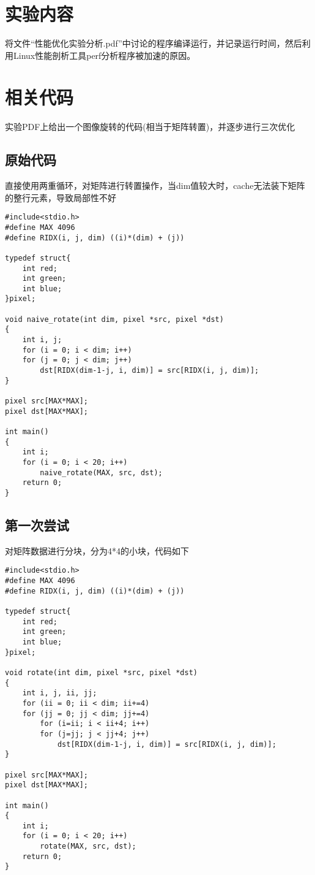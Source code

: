 \documentclass{article}
\title{
    \centering\textbf{ \hmwkTitle}
    \author{\hmwkAuthorName}
}
\begin{document}
\maketitle

\section{实验内容}
将文件“性能优化实验分析.pdf”中讨论的程序编译运行，并记录运行时间，然后利用Linux性能剖析工具perf分析程序被加速的原因。

\section{相关代码}
实验PDF上给出一个图像旋转的代码(相当于矩阵转置)，并逐步进行三次优化
\subsection{原始代码}
直接使用两重循环，对矩阵进行转置操作，当dim值较大时，cache无法装下矩阵的整行元素，导致局部性不好
\begin{lstlisting}
#include<stdio.h>
#define MAX 4096
#define RIDX(i, j, dim) ((i)*(dim) + (j))
    
typedef struct{
    int red; 
    int green; 
    int blue;
}pixel;
    
void naive_rotate(int dim, pixel *src, pixel *dst)
{
    int i, j;
    for (i = 0; i < dim; i++)
    for (j = 0; j < dim; j++)
        dst[RIDX(dim-1-j, i, dim)] = src[RIDX(i, j, dim)];
}
    
pixel src[MAX*MAX];
pixel dst[MAX*MAX];
    
int main() 
{
    int i;
    for (i = 0; i < 20; i++)
        naive_rotate(MAX, src, dst);
    return 0;
}
\end{lstlisting}

\subsection{第一次尝试}
对矩阵数据进行分块，分为4*4的小块，代码如下
\begin{lstlisting}
#include<stdio.h>
#define MAX 4096
#define RIDX(i, j, dim) ((i)*(dim) + (j))

typedef struct{
    int red; 
    int green; 
    int blue;
}pixel;

void rotate(int dim, pixel *src, pixel *dst)
{
    int i, j, ii, jj;
    for (ii = 0; ii < dim; ii+=4)
    for (jj = 0; jj < dim; jj+=4)
        for (i=ii; i < ii+4; i++)
        for (j=jj; j < jj+4; j++)
            dst[RIDX(dim-1-j, i, dim)] = src[RIDX(i, j, dim)];
}

pixel src[MAX*MAX];
pixel dst[MAX*MAX];

int main() 
{
    int i;
    for (i = 0; i < 20; i++)
        rotate(MAX, src, dst);
    return 0;
}
\end{lstlisting}
\end{document}
